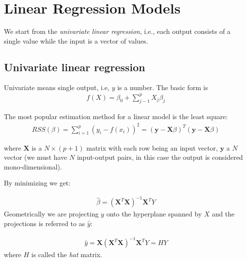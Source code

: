 \documentclass[12pt, letterpaper]{article}
\theoremstyle{definition}
\newcommand{\X}{\mathrm{\mathbf{X}}}
\begin{document}
\newpage
\section{Linear Regression Models}
We start from the \textit{univariate linear regression}, i.e., each output consists of a single value while the input is a vector of values.

\subsection{Univariate linear regression}
Univariate means single output, i.e, $y$ is a number. The basic form is 
\begin{align}
f(X) = \beta_0 + \sum_{j-1}^p X_j \beta_j
\end{align}

The most popular estimation method for a linear model is the least square:
\begin{align}
RSS(\beta) = \sum_{i=1}^{p}  \left( y_i - f(x_i) \right)^2 = \left(\bm{y} - \bm{X}\beta\right)^T \left(\bm{y} - \bm{X}\beta\right)
\end{align}

where $\bm{X}$ is a $N \times (p+1)$ matrix with each row being an input vector, $\bm{y}$ a $N$ vector (we must have $N$ input-output pairs, in this case the output is considered mono-dimensional).

By minimizing we get:

\begin{align}
\hat{\beta} = \left( \X^T \X\right)^{-1} \X^TY
\end{align}
Geometrically we are projecting $y$ onto the hyperplane spanned by $X$ and the projections is referred to as $\hat{y}$:

\begin{align}
\hat{y} =\X \left( \X^T \X\right)^{-1} \X^T Y = H Y
\end{align}
where $H$ is called the \textit{hat} matrix.


\end{document}
